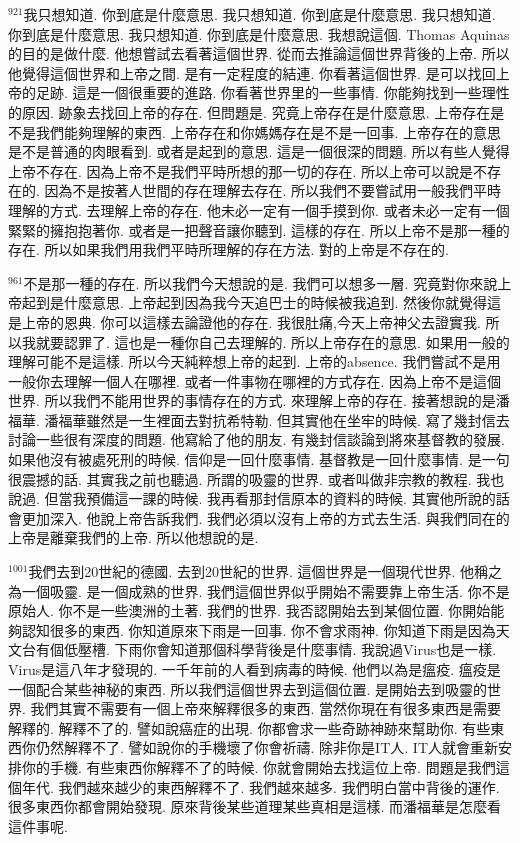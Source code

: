 \documentclass{book}
\begin{document}
$^{921}$我只想知道.
你到底是什麼意思.
我只想知道.
你到底是什麼意思.
我只想知道.
你到底是什麼意思.
我只想知道.
你到底是什麼意思.
我想說這個.
Thomas Aquinas的目的是做什麼.
他想嘗試去看著這個世界.
從而去推論這個世界背後的上帝.
所以他覺得這個世界和上帝之間.
是有一定程度的結連.
你看著這個世界.
是可以找回上帝的足跡.
這是一個很重要的進路.
你看著世界里的一些事情.
你能夠找到一些理性的原因.
跡象去找回上帝的存在.
但問題是.
究竟上帝存在是什麼意思.
上帝存在是不是我們能夠理解的東西.
上帝存在和你媽媽存在是不是一回事.
上帝存在的意思是不是普通的肉眼看到.
或者是起到的意思.
這是一個很深的問題.
所以有些人覺得上帝不存在.
因為上帝不是我們平時所想的那一切的存在.
所以上帝可以說是不存在的.
因為不是按著人世間的存在理解去存在.
所以我們不要嘗試用一般我們平時理解的方式.
去理解上帝的存在.
他未必一定有一個手摸到你.
或者未必一定有一個緊緊的擁抱抱著你.
或者是一把聲音讓你聽到.
這樣的存在.
所以上帝不是那一種的存在.
所以如果我們用我們平時所理解的存在方法.
對的上帝是不存在的.

$^{961}$不是那一種的存在.
所以我們今天想說的是.
我們可以想多一層.
究竟對你來說上帝起到是什麼意思.
上帝起到因為我今天追巴士的時候被我追到.
然後你就覺得這是上帝的恩典.
你可以這樣去論證他的存在.
我很肚痛,今天上帝神父去證實我.
所以我就要認罪了.
這也是一種你自己去理解的.
所以上帝存在的意思.
如果用一般的理解可能不是這樣.
所以今天純粹想上帝的起到.
上帝的absence.
我們嘗試不是用一般你去理解一個人在哪裡.
或者一件事物在哪裡的方式存在.
因為上帝不是這個世界.
所以我們不能用世界的事情存在的方式.
來理解上帝的存在.
接著想說的是潘福華.
潘福華雖然是一生裡面去對抗希特勒.
但其實他在坐牢的時候.
寫了幾封信去討論一些很有深度的問題.
他寫給了他的朋友.
有幾封信談論到將來基督教的發展.
如果他沒有被處死刑的時候.
信仰是一回什麼事情.
基督教是一回什麼事情.
是一句很震撼的話.
其實我之前也聽過.
所謂的吸靈的世界.
或者叫做非宗教的教程.
我也說過.
但當我預備這一課的時候.
我再看那封信原本的資料的時候.
其實他所說的話會更加深入.
他說上帝告訴我們.
我們必須以沒有上帝的方式去生活.
與我們同在的上帝是離棄我們的上帝.
所以他想說的是.

$^{1001}$我們去到20世紀的德國.
去到20世紀的世界.
這個世界是一個現代世界.
他稱之為一個吸靈.
是一個成熟的世界.
我們這個世界似乎開始不需要靠上帝生活.
你不是原始人.
你不是一些澳洲的土著.
我們的世界.
我否認開始去到某個位置.
你開始能夠認知很多的東西.
你知道原來下雨是一回事.
你不會求雨神.
你知道下雨是因為天文台有個低壓槽.
下雨你會知道那個科學背後是什麼事情.
我說過Virus也是一樣.
Virus是這八年才發現的.
一千年前的人看到病毒的時候.
他們以為是瘟疫.
瘟疫是一個配合某些神秘的東西.
所以我們這個世界去到這個位置.
是開始去到吸靈的世界.
我們其實不需要有一個上帝來解釋很多的東西.
當然你現在有很多東西是需要解釋的.
解釋不了的.
譬如說癌症的出現.
你都會求一些奇跡神跡來幫助你.
有些東西你仍然解釋不了.
譬如說你的手機壞了你會祈禱.
除非你是IT人.
IT人就會重新安排你的手機.
有些東西你解釋不了的時候.
你就會開始去找這位上帝.
問題是我們這個年代.
我們越來越少的東西解釋不了.
我們越來越多.
我們明白當中背後的運作.
很多東西你都會開始發現.
原來背後某些道理某些真相是這樣.
而潘福華是怎麼看這件事呢.
\end{document}
